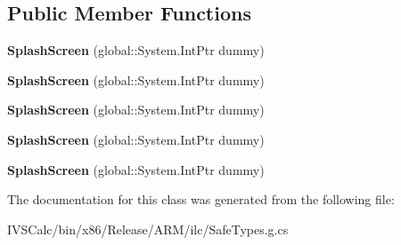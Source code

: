 \subsection*{Public Member Functions}
\begin{DoxyCompactItemize}
\item 
\mbox{\label{class_windows_1_1_application_model_1_1_activation_1_1_splash_screen_a31c32f5a1f8a23ce0938a7714d0d5f7d}} 
{\bfseries Splash\+Screen} (global\+::\+System.\+Int\+Ptr dummy)
\item 
\mbox{\label{class_windows_1_1_application_model_1_1_activation_1_1_splash_screen_a31c32f5a1f8a23ce0938a7714d0d5f7d}} 
{\bfseries Splash\+Screen} (global\+::\+System.\+Int\+Ptr dummy)
\item 
\mbox{\label{class_windows_1_1_application_model_1_1_activation_1_1_splash_screen_a31c32f5a1f8a23ce0938a7714d0d5f7d}} 
{\bfseries Splash\+Screen} (global\+::\+System.\+Int\+Ptr dummy)
\item 
\mbox{\label{class_windows_1_1_application_model_1_1_activation_1_1_splash_screen_a31c32f5a1f8a23ce0938a7714d0d5f7d}} 
{\bfseries Splash\+Screen} (global\+::\+System.\+Int\+Ptr dummy)
\item 
\mbox{\label{class_windows_1_1_application_model_1_1_activation_1_1_splash_screen_a31c32f5a1f8a23ce0938a7714d0d5f7d}} 
{\bfseries Splash\+Screen} (global\+::\+System.\+Int\+Ptr dummy)
\end{DoxyCompactItemize}


The documentation for this class was generated from the following file\+:\begin{DoxyCompactItemize}
\item 
I\+V\+S\+Calc/bin/x86/\+Release/\+A\+R\+M/ilc/Safe\+Types.\+g.\+cs\end{DoxyCompactItemize}
